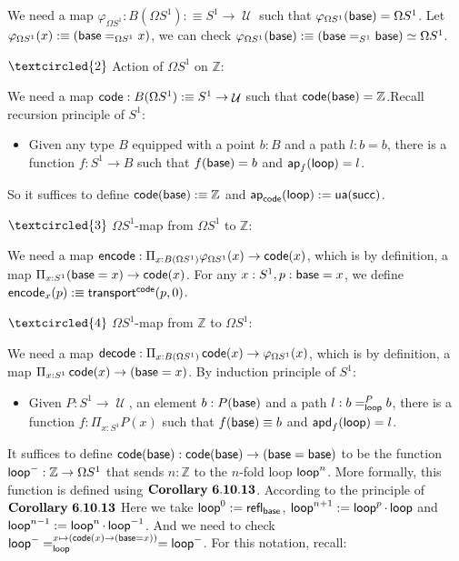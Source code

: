 \documentclass[11pt]{article}
\DeclareMathOperator{\cu}{\mathcal U}
\DeclareMathOperator{\base}{\sf base}
\DeclareMathOperator{\ap}{\sf ap}
\DeclareMathOperator{\lp}{\sf loop}
\DeclareMathOperator{\code}{\sf code}
\DeclareMathOperator{\scr}{\sf succ}
\DeclareMathOperator{\ua}{\sf ua}
\DeclareMathOperator{\apd}{\sf apd}
\DeclareMathOperator{\encode}{\sf encode}
\DeclareMathOperator{\decode}{\sf decode}
\DeclareMathOperator{\transport}{\sf transport}
\DeclareMathOperator{\rfl}{\sf refl}
\theoremstyle{definition}
\begin{document}
We need a map $\varphi_{\Omega S^1}: B(\Omega S^1):\equiv S^1\to \cu$ such that $\varphi_{\Omega S^1}(\base)=\Omega S^1$. Let $\varphi_{\Omega S^1}(x):\equiv (\base =_{\Omega S^1}x)$, we can check $\varphi_{\Omega S^1}(\base):\equiv (\base =_{S^1}\base)\simeq \Omega S^1$.

$\textcircled{2}$ Action of $\Omega S^1$ on $\mathbb Z$:

We need a map $\code : B(\Omega S^1):\equiv S^1\to \cu$ such that $\code (\base) = \mathbb Z$.Recall recursion principle of $S^1$:

\begin{itemize}
\item Given any type $B$ equipped with a point $b: B$ and a path $l:b=b$, there is a function $f: S^1\to B$ such that $f(\base)= b$ and $\ap_f(\lp)=l$.
\end{itemize}

So it suffices to define $\code(\base) :\equiv \mathbb Z$ and $\ap_{\code}(\lp) := \ua(\scr)$.


$\textcircled{3}$ $\Omega S^1$-map from $\Omega S^1$ to $\mathbb Z$:

We need a map $\encode :\Pi_{x:B(\Omega S^1)}\varphi_{\Omega S^1}(x)\to \code (x)$, which is by definition, a map $\Pi_{x:S^1}(\base = x)\to \code (x)$. For any $x: S^1,p:\base = x$, we define $\encode_x(p):\equiv \transport^{\code}(p,0)$.

$\textcircled{4}$ $\Omega S^1$-map from $\mathbb Z$ to $\Omega S^1$:


We need a map $\decode :\Pi_{x:B(\Omega S^1)}\code(x)\to \varphi_{\Omega S^1}(x)$, which is by definition, a map $\Pi_{x:S^1}\code (x)\to (\base = x)$. By induction principle of $S^1$:

\begin{itemize}
\item Given $P: S^1\to \cu$, an element $b: P(\base)$ and a path $l:b=_{\lp}^Pb$, there is a function $f:\Pi_{x: S^1}P(x)$ such that $f(\base)\equiv b$ and $\apd_f(\lp)=l$. 
\end{itemize}

It suffices to define $\code (\base ) : \code (\base)\to (\base =\base)$ to be the function $\lp^-:\mathbb Z\to \Omega S^1$ that sends $n:\mathbb Z$ to the $n$-fold loop $\lp^n$. More formally, this function is defined using $\bf Corollary \ 6.10.13$. According to the principle of $\bf Corollary \ 6.10.13$ Here we take $\lp^0:=\rfl_{\base}$, $\lp^{n+1}:=\lp^p\cdot \lp$ and $\lp^{n-1}:=\lp^n\cdot \lp^{-1}$. And we need to check $\lp^-=_{\lp}^{x\mapsto (\code(x)\to (\base = x))}=\lp^-$. For this notation, recall:
\end{document}
